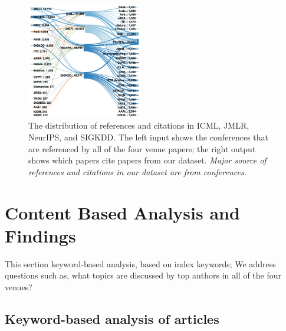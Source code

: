 \begin{figure}[H]
	\centering
	\includegraphics[width=0.45\textwidth]{figure/sanky_all.png}
	\caption{The distribution of references and citations in ICML, JMLR, NeurIPS, and SIGKDD. The left input shows the conferences that are referenced by all of the four venue papers; the right output shows which papers cite papers from our dataset. \emph{Major source of references and citations in our dataset are from conferences.} }
	\label{fig:top_flow_venues_c}
\end{figure}




\section{Content Based Analysis and Findings}
\label{sec:content}

This section keyword-based analysis, based on index keywords; We address questions such as, what topics are discussed by top authors in all of the four venues?

\subsection{Keyword-based analysis of articles} 



